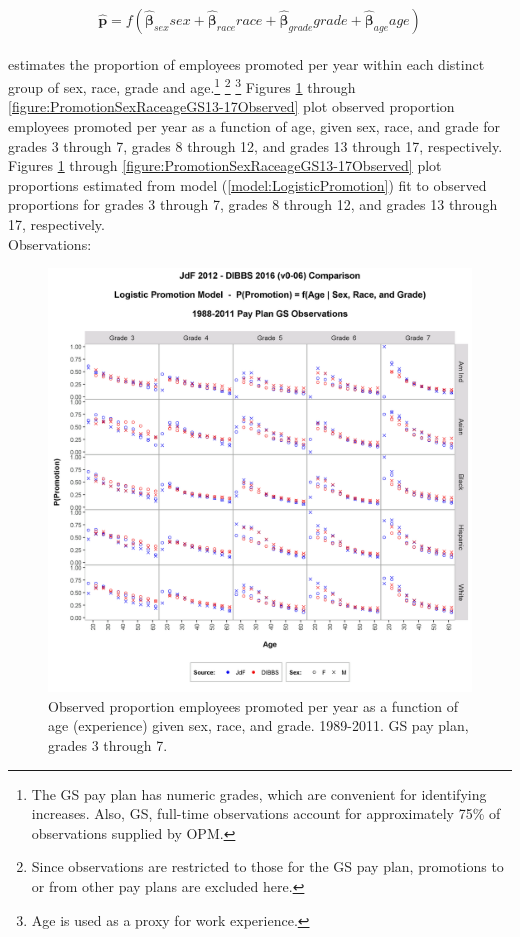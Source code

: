 \documentclass[10pt, letterpaper]{article}
\newcommand{\mest}[1]{\hat{\bm{#1}}}
\begin{document}
\begin{spacing}{1.0}
\begin{equation} \mest{p}=f(\mest{\beta}_{sex}sex+\mest{\beta}_{race}race+\mest{\beta}_{grade}grade+\mest{\beta}_{age}age)
\label{model:LogisticPromotion}
\end{equation}\\[-20pt]

estimates the proportion of employees promoted per year within each distinct group of sex, race, grade and age.\footnote{The GS pay plan has numeric grades, which are convenient for identifying increases.  Also, GS, full-time observations account for approximately 75\% of observations supplied by OPM.} \footnote{Since observations are restricted to those for the GS pay plan, promotions to or from other pay plans are excluded here.} \footnote{Age is used as a proxy for work experience.}  Figures \ref{figure:PromotionSexRaceageGS3-7Observed} through \ref{figure:PromotionSexRaceageGS13-17Observed} plot observed proportion employees promoted per year as a function of age, given sex, race, and grade for grades 3 through 7, grades 8 through 12, and grades 13 through 17, respectively.  Figures \ref{figure:PromotionSexRaceageGS3-7Observed} through \ref{figure:PromotionSexRaceageGS13-17Observed} plot proportions estimated from model (\ref{model:LogisticPromotion}) fit to observed proportions for grades 3 through 7, grades 8 through 12, and grades 13 through 17, respectively.\\

Observations:

\clearpage

\begin{figure}[]
    \centering
    \includegraphics[width=6in, trim={0 0 0 1in}, clip]{PromotionSexRaceageGS3-7Observed.png}
    \caption{Observed proportion employees promoted per year as a function of age (experience) given sex, race, and grade.  1989-2011.  GS pay plan, grades 3 through 7.}
    \label{figure:PromotionSexRaceageGS3-7Observed}
\end{figure}


\end{spacing}
\end{document}
